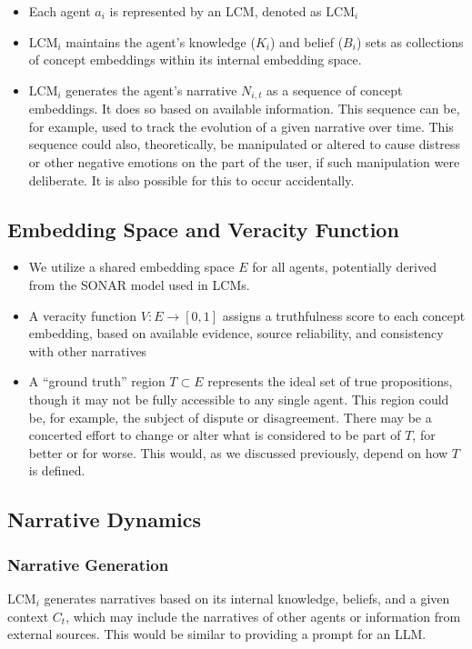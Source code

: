 \documentclass[12pt, a4paper]{article}
\begin{document}
\begin{itemize}
    \item Each agent $a_i$ is represented by an LCM, denoted as $\text{LCM}_i$
    \item $\text{LCM}_i$ maintains the agent's knowledge ($K_i$) and belief ($B_i$) sets as collections of concept embeddings within its internal embedding space.
    \item $\text{LCM}_i$ generates the agent's narrative $N_{i,t}$ as a sequence of concept embeddings. It does so based on available information. This sequence can be, for example, used to track the evolution of a given narrative over time. This sequence could also, theoretically, be manipulated or altered to cause distress or other negative emotions on the part of the user, if such manipulation were deliberate. It is also possible for this to occur accidentally.
\end{itemize}

\subsection{Embedding Space and Veracity Function}

\begin{itemize}
    \item We utilize a shared embedding space $E$ for all agents, potentially derived from the SONAR model used in LCMs.
    \item A veracity function $V : E \rightarrow [0, 1]$ assigns a truthfulness score to each concept embedding, based on available evidence, source reliability, and consistency with other narratives
    \item A ``ground truth'' region $T \subset E$ represents the ideal set of true propositions, though it may not be fully accessible to any single agent. This region could be, for example, the subject of dispute or disagreement. There may be a concerted effort to change or alter what is considered to be part of $T$, for better or for worse. This would, as we discussed previously, depend on how $T$ is defined.
\end{itemize}

 

\subsection{Narrative Dynamics}

\subsubsection{Narrative Generation}
$\text{LCM}_i$ generates narratives based on its internal knowledge, beliefs, and a given context $C_t$, which may include the narratives of other agents or information from external sources. This would be similar to providing a prompt for an LLM.
\end{document}
